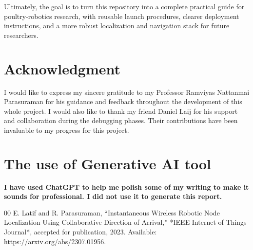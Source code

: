 \documentclass[conference]{IEEEtran}
\begin{document}
Ultimately, the goal is to turn this repository into a complete practical guide for poultry-robotics research, with reusable launch procedures, clearer deployment instructions, and a more robust localization and navigation stack for future researchers.

\section*{Acknowledgment}
I would like to express my sincere gratitude to my Professor Ramviyas Nattanmai Parasuraman for his guidance and feedback throughout the development of this whole project. I would also like to thank my friend Daniel Laij for his support and collaboration during the debugging phases. Their contributions have been invaluable to my progress for this project. 
\section{The use of Generative AI tool}
\textbf{I have used ChatGPT to help me polish some of my writing to make it sounds for professional. I did not use it to generate this report. }

\begin{thebibliography}{00}
 E. Latif and R. Parasuraman, ``Instantaneous Wireless Robotic Node Localization Using Collaborative Direction of Arrival,'' *IEEE Internet of Things Journal*, accepted for publication, 2023. Available: https://arxiv.org/abs/2307.01956.


\end{thebibliography}
\end{document}

